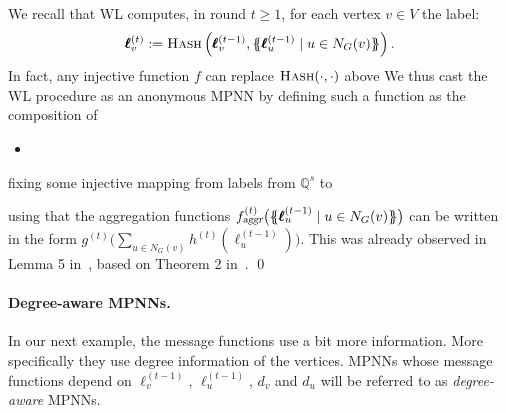 \begin{example}\label{ex:WL}
We recall that WL computes, in round $t \geq 1$, for each vertex $v\in V$ the label:
$$
\pmb{\ell}^{(t)}_v:=\textsc{Hash}\left(\pmb{\ell}^{(t-1)}_v,\{\!\!\{ \pmb{\ell}_u^{(t-1)} \mathrel{\mid} u \in N_G(v) \}\!\!\}\right).
$$
In fact, any injective function $f$ can
replace $\textsc{Hash}(\cdot,\cdot)$ above
We thus cast the WL procedure
as an anonymous MPNN by defining such a function
as the composition of
\begin{itemize}
    \item 
\end{itemize}fixing
some injective mapping from
labels from $\mathbb{Q}^s$ to 

using
that the aggregation functions $f_{\textsl{aggr}}^{(t)}\bigl(\{\!\!\{ \pmb{\ell}^{(t-1)}_{u} \mid u \in N_G(v) \}\!\!\}\bigr)$ can be written in the form $g^{(t)}\bigl(\sum_{u\in N_G(v)} h^{(t)}(\pmb{\ell}^{(t-1)}_{u})\bigr)$. This was already observed in Lemma 5 in~\cite{xhlj19}, based on Theorem 2 in~\cite{ZaheerKRPSS17}.
\qed
 \end{example}

\paragraph{Degree-aware MPNNs.} In our next example, the message functions use a bit more information. More specifically they use  degree information of the vertices.
MPNNs whose message functions depend on 
 $\pmb{\ell}_v^{(t-1)}$, $\pmb{\ell}_u^{(t-1)}$, $d_v$ and $d_u$ will be referred to as \textit{degree-aware} MPNNs. 

